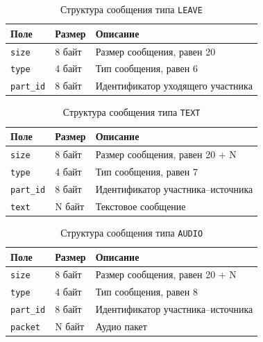\begin{table}[H]
  \centering
  \caption{Структура сообщения типа \texttt{LEAVE}}
  \label{tbl:msg:leave}
  \begin{tabular}{|l|l|l|}
    \hline
    \textbf{Поле} & \textbf{Размер} & \textbf{Описание} \\ \hline
    \texttt{size} & 8 байт & Размер сообщения, равен 20 \\ \hline
    \texttt{type} & 4 байт & Тип сообщения, равен 6 \\ \hline
    \texttt{part\_id} & 8 байт & Идентификатор уходящего участника \\ \hline
  \end{tabular}
\end{table}

\begin{table}[H]
  \centering
  \caption{Структура сообщения типа \texttt{TEXT}}
  \label{tbl:msg:text}
  \begin{tabular}{|l|l|l|}
    \hline
    \textbf{Поле} & \textbf{Размер} & \textbf{Описание} \\ \hline
    \texttt{size} & 8 байт & Размер сообщения, равен 20 + N \\ \hline
    \texttt{type} & 4 байт & Тип сообщения, равен 7 \\ \hline
    \texttt{part\_id} & 8 байт & Идентификатор участника--источника \\ \hline
    \texttt{text} & N байт & Текстовое сообщение \\ \hline
  \end{tabular}
\end{table}

\begin{table}[H]
  \centering
  \caption{Структура сообщения типа \texttt{AUDIO}}
  \label{tbl:msg:audio}
  \begin{tabular}{|l|l|l|}
    \hline
    \textbf{Поле} & \textbf{Размер} & \textbf{Описание} \\ \hline
    \texttt{size} & 8 байт & Размер сообщения, равен 20 + N \\ \hline
    \texttt{type} & 4 байт & Тип сообщения, равен 8 \\ \hline
    \texttt{part\_id} & 8 байт & Идентификатор участника--источника \\ \hline
    \texttt{packet} & N байт & Аудио пакет \\ \hline
  \end{tabular}
\end{table}

